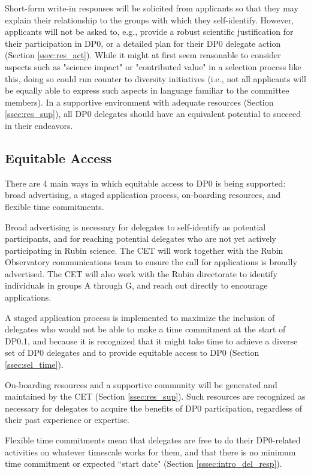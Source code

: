 \documentclass[DM,lsstdraft,authoryear,toc]{lsstdoc}
\begin{document}
Short-form write-in responses will be solicited from applicants so that they may explain their relationship to the groups with which they self-identify.
However, applicants will not be asked to, e.g., provide a robust scientific justification for their participation in DP0, or a detailed plan for their DP0 delegate action (Section \ref{ssec:res_act}).
While it might at first seem reasonable to consider aspects such as "science impact" or "contributed value" in a selection process like this, doing so could run counter to diversity initiatives (i.e., not all applicants will be equally able to express such aspects in language familiar to the committee members).
In a supportive environment with adequate resources (Section \ref{ssec:res_sup}), all DP0 delegates should have an equivalent potential to succeed in their endeavors.


\subsection{Equitable Access}\label{ssec:sel_equity}

There are 4 main ways in which equitable access to DP0 is being supported: broad advertising, a staged application process, on-boarding resources, and flexible time commitments.

Broad advertising is necessary for delegates to self-identify as potential participants, and for reaching potential delegates who are not yet actively participating in Rubin science.
The CET will work together with the Rubin Observatory communications team to ensure the call for applications is broadly advertised. 
The CET will also work with the Rubin directorate to identify individuals in groups A through G, and reach out directly to encourage applications. 

A staged application process is implemented to maximize the inclusion of delegates who would not be able to make a time commitment at the start of DP0.1, and because it is recognized that it might take time to achieve a diverse set of DP0 delegates and to provide equitable access to DP0 (Section \ref{ssec:sel_time}).

On-boarding resources and a supportive community will be generated and maintained by the CET (Section \ref{ssec:res_sup}).
Such resources are recognized as necessary for delegates to acquire the benefits of DP0 participation, regardless of their past experience or expertise.

Flexible time commitments mean that delegates are free to do their DP0-related activities on whatever timescale works for them, and that there is no minimum time commitment or expected ``start date" (Section \ref{sssec:intro_del_resp}).
\end{document}
